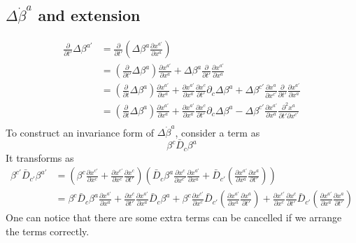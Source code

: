 \documentclass{article}
\begin{document}
\subsection{$\Delta {\dot \beta}^{a}$ and extension}
\begin{align*}
\frac{\partial}{\partial t'}\Delta\beta^{a'} & = \frac{\partial }{\partial t'}(\Delta \beta^{a}\frac{\partial x^{a'}}{\partial x^{a}})\\
& = (\frac{\partial}{\partial t'}\Delta\beta^{a})\frac{\partial x^{a'}}{\partial x^{a}} + \Delta\beta^{a}\frac{\partial}{\partial t'}\frac{\partial x^{a'}}{\partial x^{a}}\\
& = (\frac{\partial}{\partial t}\Delta \beta^{a})\frac{\partial x^{a'}}{\partial x^{a}} + \frac{\partial x^{a'}}{\partial x^{a}}\frac{\partial x^{c}}{\partial t'}\partial_{c}\Delta \beta^{a} + \Delta \beta^{c'}\frac{\partial x^{a}}{\partial x^{c'}}\frac{\partial}{\partial t'}\frac{\partial x^{a'}}{\partial x^{a}}\\
& = (\frac{\partial}{\partial t}\Delta \beta^{a})\frac{\partial x^{a'}}{\partial x^{a}} + \frac{\partial x^{a'}}{\partial x^{a}}\frac{\partial x^{c}}{\partial t'}\partial_{c}\Delta \beta^{a} - \Delta \beta^{c'}\frac{\partial x^{a'}}{\partial x^{a}}\frac{\partial^2 x^{a}}{\partial t' \partial x^{c'}}\\
\end{align*}
To construct an invariance form of $\Delta {\dot \beta}^{a}$, consider a term as
\[
\beta^{c}{\bar D}_{c}\beta^{a}
\]
It transforms as
\begin{align*}
\beta^{c'}{\bar D}_{c'}\beta^{a'} & = (\beta^{c}\frac{\partial x^{c'}}{\partial x^{c}} + \frac{\partial x^{c'}}{\partial x^{c}}\frac{\partial x^{c}}{\partial t'})({\bar D}_{c}\beta^{a}\frac{\partial x^{c}}{\partial x^{c'}}\frac{\partial x^{a'}}{\partial x^{a}} + {\bar D}_{c'}(\frac{\partial x^{a'}}{\partial x^{a}}\frac{\partial x^{a}}{\partial t'}))\\
& = \beta^{c}{\bar D}_{c}\beta^{a}\frac{\partial x^{a'}}{\partial x^{a}} + \frac{\partial x^{c}}{\partial t'}\frac{\partial x^{a'}}{\partial x^{a}}{\bar D}_{c}\beta^{a} + \beta^{c}\frac{\partial x^{c'}}{\partial x^{c}}{\bar D}_{c'}(\frac{\partial x^{a'}}{\partial x^{a}}\frac{\partial x^{a}}{\partial t'}) +  \frac{\partial x^{c'}}{\partial x^{c}}\frac{\partial x^{c}}{\partial t'} {\bar D}_{c'}(\frac{\partial x^{a'}}{\partial x^{a}}\frac{\partial x^{a}}{\partial t'})
\end{align*}
One can notice that there are some extra terms can be cancelled if we arrange the terms correctly. \\
\end{document}
